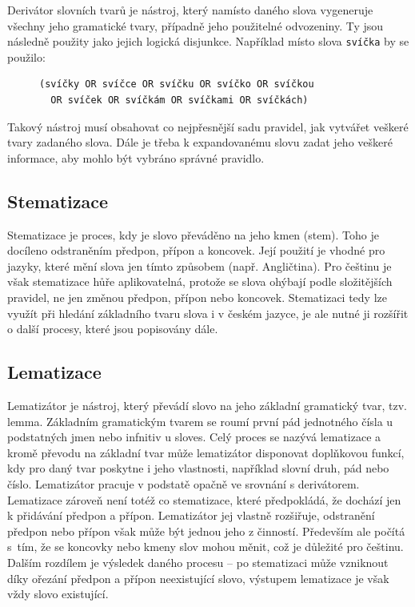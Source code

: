 \documentclass[FM,DP]{tulthesis}
\begin{document}
Derivátor slovních tvarů je nástroj, který namísto daného slova vygeneruje 
všechny jeho gramatické tvary, případně jeho použitelné odvozeniny. 
Ty jsou následně použity jako jejich logická disjunkce. Například místo 
slova \verb|svíčka| by se použilo:

\begin{figure}[thp]
\centering 
\begin{minipage}{0.73\textwidth}
\begin{verbatim}
(svíčky OR svíčce OR svíčku OR svíčko OR svíčkou 
  OR svíček OR svíčkám OR svíčkami OR svíčkách)
\end{verbatim}
\end{minipage}
\end{figure}

Takový nástroj musí obsahovat co nejpřesnější sadu pravidel, jak vytvářet
veškeré tvary zadaného slova. Dále je třeba k expandovanému slovu zadat
jeho veškeré informace, aby mohlo být vybráno správné pravidlo.

\subsection{Stematizace}

Stematizace je proces, kdy je slovo převáděno na jeho kmen (stem). Toho je docíleno
odstraněním předpon, přípon a koncovek. Její použití je vhodné pro jazyky, 
které mění slova jen tímto způsobem (např. Angličtina). Pro češtinu je však stematizace
hůře aplikovatelná, protože se slova ohýbají podle složitějších pravidel, ne jen
změnou předpon, přípon nebo koncovek. Stematizaci tedy lze využít při hledání základního
tvaru slova i v českém jazyce, je ale nutné ji rozšířit o další procesy, které jsou 
popisovány dále.

\subsection{Lematizace}

Lematizátor je nástroj, který převádí slovo na jeho základní gramatický tvar, tzv. lemma.
Základním gramatickým tvarem se roumí první pád jednotného čísla u podstatných jmen nebo infnitiv 
u sloves. Celý proces se nazývá lematizace a kromě převodu na základní tvar může lematizátor
disponovat doplňkovou funkcí, kdy pro daný tvar poskytne i jeho vlastnosti, například 
slovní druh, pád nebo číslo. Lematizátor pracuje v podstatě opačně ve srovnání s derivátorem. 
Lematizace zároveň není totéž co stematizace, které předpokládá, že dochází 
jen k přidávání předpon a přípon. Lematizátor jej vlastně rozšiřuje, odstranění
předpon nebo přípon však může být jednou jeho z činností. Především ale počítá s~tím, 
že se koncovky nebo kmeny slov mohou měnit, což je důležité pro češtinu.
Dalším rozdílem je výsledek daného procesu -- po stematizaci může vzniknout díky ořezání
předpon a přípon neexistující slovo, výstupem lematizace je však vždy slovo existující.
\end{document}
